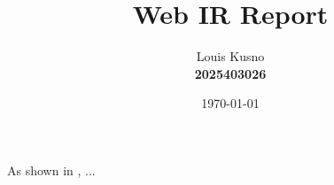 \documentclass[12pt,a4paper]{article}
\begin{document}
\title{Web IR Report}
\author{Louis Kusno \\
	\textbf{2025403026}}
\date{\today}
\maketitle


\tableofcontents
\clearpage








As shown in \cite{einstein1905}, ...


\end{document}
